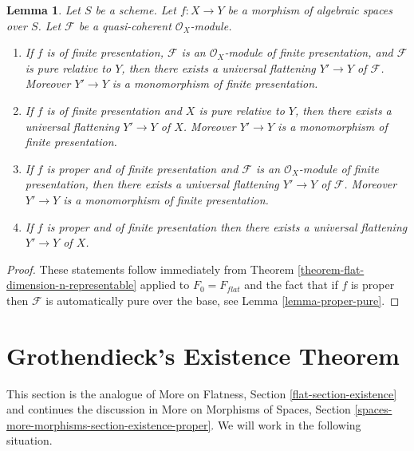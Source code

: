 \documentclass{stacks-project}
\theoremstyle{plain}
\newtheorem{lemma}[subsection]{Lemma}
\theoremstyle{definition}
\theoremstyle{remark}
\numberwithin{equation}{subsection}
\begin{document}
\begin{lemma}
\label{lemma-when-universal-flattening}
Let $S$ be a scheme.
Let $f : X \to Y$ be a morphism of algebraic spaces over $S$.
Let $\mathcal{F}$ be a quasi-coherent $\mathcal{O}_X$-module.
\begin{enumerate}
\item If $f$ is of finite presentation, $\mathcal{F}$ is an
$\mathcal{O}_X$-module of finite presentation, and $\mathcal{F}$ is
pure relative to $Y$, then there exists a universal flattening
$Y' \to Y$ of $\mathcal{F}$. Moreover $Y' \to Y$ is a monomorphism
of finite presentation.
\item If $f$ is of finite presentation and $X$ is pure relative to $Y$,
then there exists a universal flattening $Y' \to Y$ of $X$.
Moreover $Y' \to Y$ is a monomorphism of finite presentation.
\item If $f$ is proper and of finite presentation and $\mathcal{F}$ is an
$\mathcal{O}_X$-module of finite presentation, then there exists a
universal flattening $Y' \to Y$ of $\mathcal{F}$. Moreover $Y' \to Y$ is
a monomorphism of finite presentation.
\item If $f$ is proper and of finite presentation
then there exists a universal flattening $Y' \to Y$ of $X$.
\end{enumerate}
\end{lemma}

\begin{proof}
These statements follow immediately from
Theorem \ref{theorem-flat-dimension-n-representable}
applied to $F_0 = F_{flat}$
and the fact that if $f$ is proper then $\mathcal{F}$ is automatically
pure over the base, see
Lemma \ref{lemma-proper-pure}.
\end{proof}






\section{Grothendieck's Existence Theorem}
\label{section-existence}

\noindent
This section is the analogue of
More on Flatness, Section \ref{flat-section-existence}
and continues the discussion in
More on Morphisms of Spaces, Section
\ref{spaces-more-morphisms-section-existence-proper}.
We will work in the following situation.
\end{document}

